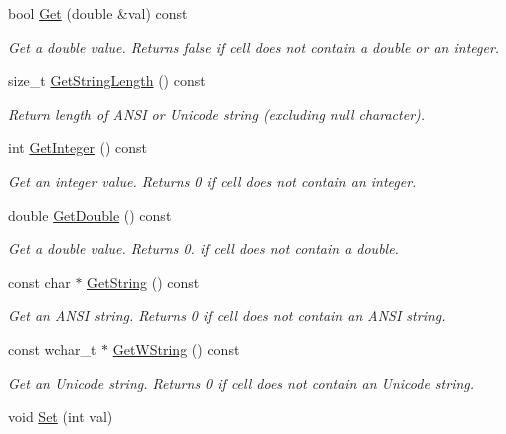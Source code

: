 \begin{DoxyCompactItemize}
bool \hyperlink{class_y_excel_1_1_basic_excel_cell_a74199e7dd46b22fd0b67ee42e652ee49}{Get} (double \&val) const 
\begin{DoxyCompactList}\small\item\em Get a double value. Returns false if cell does not contain a double or an integer. \end{DoxyCompactList}\item 
size\+\_\+t \hyperlink{class_y_excel_1_1_basic_excel_cell_a2ca927d2a0d52d5036c71c7cdfb07a3e}{Get\+String\+Length} () const 
\begin{DoxyCompactList}\small\item\em Return length of A\+N\+S\+I or Unicode string (excluding null character). \end{DoxyCompactList}\item 
int \hyperlink{class_y_excel_1_1_basic_excel_cell_af171d3ac7bd0873073832720d6857c9e}{Get\+Integer} () const 
\begin{DoxyCompactList}\small\item\em Get an integer value. Returns 0 if cell does not contain an integer. \end{DoxyCompactList}\item 
double \hyperlink{class_y_excel_1_1_basic_excel_cell_adddf212804f649bfbca5329b8c34b5fa}{Get\+Double} () const 
\begin{DoxyCompactList}\small\item\em Get a double value. Returns 0. if cell does not contain a double. \end{DoxyCompactList}\item 
const char $\ast$ \hyperlink{class_y_excel_1_1_basic_excel_cell_a73f2b25fc3da37c533de2aaa1186ebfd}{Get\+String} () const 
\begin{DoxyCompactList}\small\item\em Get an A\+N\+S\+I string. Returns 0 if cell does not contain an A\+N\+S\+I string. \end{DoxyCompactList}\item 
const wchar\+\_\+t $\ast$ \hyperlink{class_y_excel_1_1_basic_excel_cell_a9d5aabe1efc4de29a51063b308a6949b}{Get\+W\+String} () const 
\begin{DoxyCompactList}\small\item\em Get an Unicode string. Returns 0 if cell does not contain an Unicode string. \end{DoxyCompactList}\item 
void \hyperlink{class_y_excel_1_1_basic_excel_cell_a18001f12f853f12dd28d40af66a29fa5}{Set} (int val)

\end{DoxyCompactItemize}
